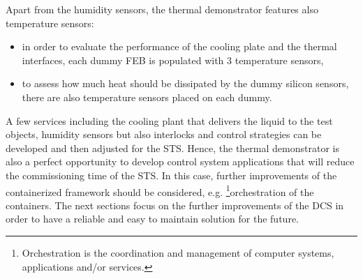  Apart from the humidity sensors, the thermal demonstrator features also temperature sensors:
 \begin{itemize}
     \item in order to evaluate the performance of the cooling plate and the thermal interfaces, each dummy \gls{FEB} is populated with 3 temperature sensors,
     \item to assess how much heat should be dissipated by the dummy silicon sensors, there are also temperature sensors placed on each dummy.
 \end{itemize}

A few services including the cooling plant that delivers the liquid to the test objects, humidity sensors but also interlocks and control strategies can be developed and then adjusted for the \gls{STS}. Hence, the thermal demonstrator is also a perfect opportunity to develop control system applications that will reduce the commissioning time of the \gls{STS}. In this case, further improvements of the containerized framework should be considered, e.g. \footnote{Orchestration is the coordination and management of computer systems, applications and/or services.}{orchestration} of the containers. The next sections focus on the further improvements of the \gls{DCS} in order to have a reliable and easy to maintain solution for the future. 